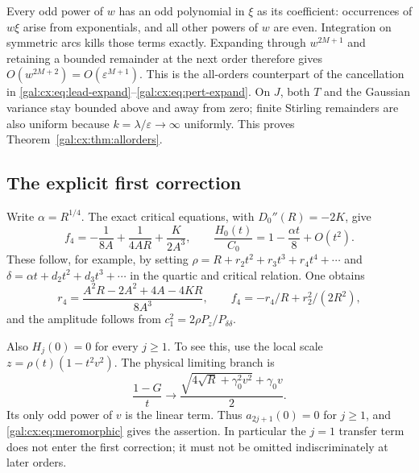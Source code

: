 \documentclass[11pt,letterpaper]{article}
\numberwithin{equation}{section}
\theoremstyle{definition}\newtheorem{definition}[theorem]{Definition}
\theoremstyle{remark}\newtheorem{remark}[theorem]{Remark}
\newcommand{\eps}{\varepsilon}
\begin{document}
Every odd power of $w$ has an odd polynomial in $\xi$ as its coefficient: occurrences of $w\xi$ arise from exponentials, and all other powers of $w$ are even. Integration on symmetric arcs kills those terms exactly. Expanding through $w^{2M+1}$ and retaining a bounded remainder at the next order therefore gives $O(w^{2M+2})=O(\eps^{M+1})$. This is the all-orders counterpart of the cancellation in \eqref{gal:cx:eq:lead-expand}--\eqref{gal:cx:eq:pert-expand}. On $J$, both $T$ and the Gaussian variance stay bounded above and away from zero; finite Stirling remainders are also uniform because $k=\lambda/\eps\to\infty$ uniformly. This proves Theorem~\ref{gal:cx:thm:allorders}.

\subsection{The explicit first correction}
Write $\alpha=R^{1/4}$. The exact critical equations, with
$D_0''(R)=-2K$, give
\begin{equation}\label{gal:cx:eq:f4amp}
f_4=-\frac1{8A}+\frac1{4AR}+\frac{K}{2A^3},
\qquad \frac{H_0(t)}{C_0}=1-\frac{\alpha t}{8}+O(t^2).
\end{equation}
These follow, for example, by setting
$\rho=R+r_2t^2+r_3t^3+r_4t^4+\cdots$ and
$\delta=\alpha t+d_2t^2+d_3t^3+\cdots$ in the quartic and critical relation. One obtains
\[
r_4=\frac{A^2R-2A^2+4A-4KR}{8A^3},\qquad
f_4=-r_4/R+r_2^2/(2R^2),
\]
and the amplitude follows from $c_1^2=2\rho P_z/P_{\delta\delta}$.

Also $H_j(0)=0$ for every $j\ge1$. To see this, use the local scale
$z=\rho(t)(1-t^2v^2)$. The physical limiting branch is
\begin{equation}\label{gal:cx:eq:limiting-inner}
\frac{1-G}{t}\longrightarrow
\frac{\sqrt{4\sqrt R+\gamma_0^2v^2}+\gamma_0v}{2}.
\end{equation}
Its only odd power of $v$ is the linear term. Thus
$a_{2j+1}(0)=0$ for $j\ge1$, and \eqref{gal:cx:eq:meromorphic} gives the assertion. In particular the $j=1$ transfer term does not enter the first correction; it must not be omitted indiscriminately at later orders.
\end{document}

